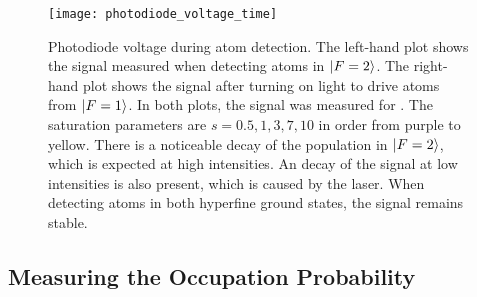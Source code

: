 \begin{figure}[htpb!]
  \centering
  \texttt{[image: photodiode\_voltage\_time]}
  \caption[Photodiode voltages during atom detection for varying
  detection times.]{Photodiode voltage during atom detection. The
    left-hand plot shows the signal measured when detecting atoms in
    $\ket{F=2}$. The right-hand plot shows the signal after turning on
    light to drive atoms from $\ket{F=1}$. In both plots, the signal
    was measured for . The saturation parameters
    are \(s =
    0.5, 1, 3, 7, 10\) in order from purple to yellow. There is a
  noticeable decay of the population in $\ket{F=2}$, which is expected
at high intensities. An decay of the signal at low intensities is also
present, which is caused by the \Muquans laser. When detecting atoms
in both hyperfine ground states, the signal remains stable.}
  \label{fig:detection_time}
\end{figure}

\subsection{Measuring the Occupation Probability}\label{subsec:phase_measurement}

